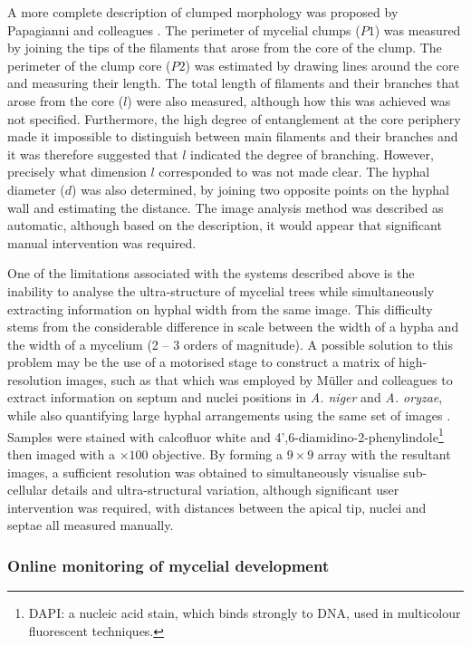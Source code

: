 A more complete description of clumped morphology was proposed by Papagianni and colleagues \cite{papagianni1994}. The perimeter of mycelial clumps ($P1$) was measured by joining the tips of the filaments that arose from the core of the clump. The perimeter of the clump core ($P2$) was estimated by drawing lines around the core and measuring their length. The total length of filaments and their branches that arose from the core ($l$) were also measured, although how this was achieved was not specified. Furthermore, the high degree of entanglement at the core periphery made it impossible to distinguish between main filaments and their branches and it was therefore suggested that $l$ indicated the degree of branching. However, precisely what dimension $l$ corresponded to was not made clear. The hyphal diameter ($d$) was also determined, by joining two opposite points on the hyphal wall and estimating the distance. The image analysis method was described as automatic, although based on the description, it would appear that significant manual intervention was required.

One of the limitations associated with the systems described above is the inability to analyse the ultra-structure of mycelial trees while simultaneously extracting information on hyphal width from the same image. This difficulty stems from the considerable difference in scale between the width of a hypha and the width of a mycelium (2 -- 3 orders of magnitude). A possible solution to this problem may be the use of a motorised stage to construct a matrix of high-resolution images, such as that which was employed by M\"{u}ller and colleagues to extract information on septum and nuclei positions in \emph{A. niger} and \emph{A. oryzae}, while also quantifying large hyphal arrangements using the same set of images \cite{muller2000}. Samples were stained with calcofluor white and 4',6-diamidino-2-phenylindole\footnote{DAPI: a nucleic acid stain, which binds strongly to DNA, used in multicolour fluorescent techniques.} then imaged with a $\times 100$ objective. By forming a $9 \times 9$ array with the resultant images, a sufficient resolution was obtained to simultaneously visualise sub-cellular details and ultra-structural variation, although significant user intervention was required, with distances between the apical tip, nuclei and septae all measured manually.

\subsubsection{Online monitoring of mycelial development}

